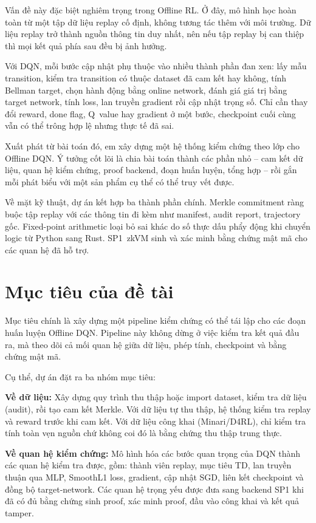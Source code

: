 \documentclass[12pt,a4paper,oneside]{report}
\begin{document}
Vấn đề này đặc biệt nghiêm trọng trong Offline RL. Ở đây, mô hình học hoàn toàn từ một tập dữ liệu replay cố định, không tương tác thêm với môi trường. Dữ liệu replay trở thành nguồn thông tin duy nhất, nên nếu tập replay bị can thiệp thì mọi kết quả phía sau đều bị ảnh hưởng.

Với DQN, mỗi bước cập nhật phụ thuộc vào nhiều thành phần đan xen: lấy mẫu transition, kiểm tra transition có thuộc dataset đã cam kết hay không, tính Bellman target, chọn hành động bằng online network, đánh giá giá trị bằng target network, tính loss, lan truyền gradient rồi cập nhật trọng số. Chỉ cần thay đổi reward, done flag, Q~value hay gradient ở một bước, checkpoint cuối cùng vẫn có thể trông hợp lệ nhưng thực tế đã sai.

Xuất phát từ bài toán đó, em xây dựng một hệ thống kiểm chứng theo lớp cho Offline DQN. Ý tưởng cốt lõi là chia bài toán thành các phần nhỏ -- cam kết dữ liệu, quan hệ kiểm chứng, proof backend, đoạn huấn luyện, tổng hợp -- rồi gắn mỗi phát biểu với một sản phẩm cụ thể có thể truy vết được.

Về mặt kỹ thuật, dự án kết hợp ba thành phần chính. Merkle commitment ràng buộc tập replay với các thông tin đi kèm như manifest, audit report, trajectory gốc. Fixed-point arithmetic loại bỏ sai khác do số thực dấu phẩy động khi chuyển logic từ Python sang Rust. SP1~zkVM sinh và xác minh bằng chứng mật mã cho các quan hệ đã hỗ trợ.

\section{Mục tiêu của đề tài}

Mục tiêu chính là xây dựng một pipeline kiểm chứng có thể tái lập cho các đoạn huấn luyện Offline DQN. Pipeline này không dừng ở việc kiểm tra kết quả đầu ra, mà theo dõi cả mối quan hệ giữa dữ liệu, phép tính, checkpoint và bằng chứng mật mã.

Cụ thể, dự án đặt ra ba nhóm mục tiêu:

\textbf{Về dữ liệu:} Xây dựng quy trình thu thập hoặc import dataset, kiểm tra dữ liệu (audit), rồi tạo cam kết Merkle. Với dữ liệu tự thu thập, hệ thống kiểm tra replay và reward trước khi cam kết. Với dữ liệu công khai (Minari/D4RL), chỉ kiểm tra tính toàn vẹn nguồn chứ không coi đó là bằng chứng thu thập trung thực.

\textbf{Về quan hệ kiểm chứng:} Mô hình hóa các bước quan trọng của DQN thành các quan hệ kiểm tra được, gồm: thành viên replay, mục tiêu TD, lan truyền thuận qua MLP, SmoothL1 loss, gradient, cập nhật SGD, liên kết checkpoint và đồng bộ target-network. Các quan hệ trọng yếu được đưa sang backend SP1 khi đã có đủ bằng chứng sinh proof, xác minh proof, đầu vào công khai và kết quả tamper.
\end{document}
